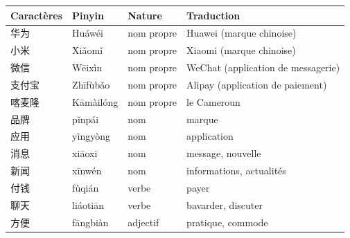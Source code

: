 \documentclass[11pt]{article}
\begin{document}
\begin{center}
\begin{tabularx}{\linewidth}{|X|X|X|X|}
\hline
\rowcolor{popblueL} Caractères & Pinyin & Nature & Traduction \\
\hline
华为 & Huáwéi & nom propre & Huawei (marque chinoise) \\
\hline
小米 & Xiǎomǐ & nom propre & Xiaomi (marque chinoise) \\
\hline
微信 & Wēixìn & nom propre & WeChat (application de messagerie) \\
\hline
支付宝 & Zhīfùbǎo & nom propre & Alipay (application de paiement) \\
\hline
喀麦隆 & Kāmàilóng & nom propre & le Cameroun \\
\hline
品牌 & pǐnpái & nom & marque \\
\hline
应用 & yìngyòng & nom & application \\
\hline
消息 & xiāoxi & nom & message, nouvelle \\
\hline
新闻 & xīnwén & nom & informations, actualités \\
\hline
付钱 & fùqián & verbe & payer \\
\hline
聊天 & liáotiān & verbe & bavarder, discuter \\
\hline
方便 & fāngbiàn & adjectif & pratique, commode \\
\hline
\end{tabularx}
\end{center}
\end{document}
